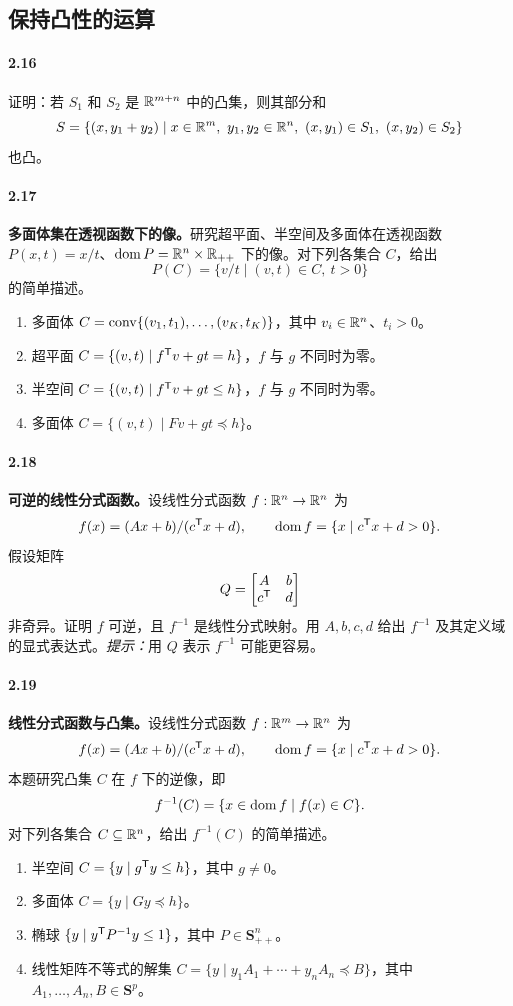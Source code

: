 \subsection*{保持凸性的运算}
\paragraph{2.16}
证明：若 $S_1$ 和 $S_2$ 是 $\mathbb R^{m+n}$ 中的凸集，则其部分和
\[
 S=\{(x,y_1+y_2)\mid x\in\R^m,\ y_1,y_2\in\R^n,
 \ (x,y_1)\in S_1,\ (x,y_2)\in S_2\}
\]
也凸。

\paragraph{2.17}
\textbf{多面体集在透视函数下的像。}研究超平面、半空间及多面体在透视函数 $P(x,t)=x/t$、$\operatorname{dom} P=\mathbb R^n\times\mathbb R_{++}$ 下的像。对下列各集合 $C$，给出
\[
 P(C)=\{v/t\mid(v,t)\in C,\ t>0\}
\]
的简单描述。
\begin{enumerate}[label=(\alph*)]
\item 多面体 $C=\operatorname{conv}\{(v_1,t_1),\ldots,(v_K,t_K)\}$，其中 $v_i\in\mathbb R^n$、$t_i>0$。
\item 超平面 $C=\{(v,t)\mid f^{\mathsf T}v+gt=h\}$，$f$ 与 $g$ 不同时为零。
\item 半空间 $C=\{(v,t)\mid f^{\mathsf T}v+gt\le h\}$，$f$ 与 $g$ 不同时为零。
\item 多面体 $C=\{(v,t)\mid Fv+gt\preceq h\}$。
\end{enumerate}

\paragraph{2.18}
\textbf{可逆的线性分式函数。}设线性分式函数 $f:\mathbb R^n\to\mathbb R^n$ 为
\[
 f(x)=(Ax+b)/(c^{\mathsf T}x+d),\qquad\operatorname{dom} f=\{x\mid c^{\mathsf T}x+d>0\}.
\]
假设矩阵
\[
 Q=\begin{bmatrix}A&b\\c^{\mathsf T}&d\end{bmatrix}
\]
非奇异。证明 $f$ 可逆，且 $f^{-1}$ 是线性分式映射。用 $A,b,c,d$ 给出 $f^{-1}$ 及其定义域的显式表达式。\emph{提示：}用 $Q$ 表示 $f^{-1}$ 可能更容易。

\paragraph{2.19}
\textbf{线性分式函数与凸集。}设线性分式函数 $f:\mathbb R^m\to\mathbb R^n$ 为
\[
 f(x)=(Ax+b)/(c^{\mathsf T}x+d),\qquad\operatorname{dom} f=\{x\mid c^{\mathsf T}x+d>0\}.
\]
本题研究凸集 $C$ 在 $f$ 下的逆像，即
\[
 f^{-1}(C)=\{x\in\operatorname{dom} f\mid f(x)\in C\}.
\]
对下列各集合 $C\subseteq\mathbb R^n$，给出 $f^{-1}(C)$ 的简单描述。
\begin{enumerate}[label=(\alph*)]
\item 半空间 $C=\{y\mid g^{\mathsf T}y\le h\}$，其中 $g\ne0$。
\item 多面体 $C=\{y\mid Gy\preceq h\}$。
\item 椭球 $\{y\mid y^{\mathsf T}P^{-1}y\le1\}$，其中 $P\in\mathbf S_{++}^n$。
\item 线性矩阵不等式的解集 $C=\{y\mid y_1A_1+\cdots+y_nA_n\preceq B\}$，其中 $A_1,\ldots,A_n,B\in\mathbf S^p$。
\end{enumerate}

